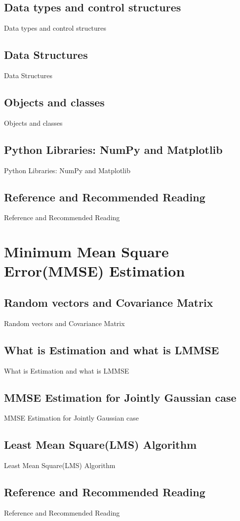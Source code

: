 \documentclass[a4paper,12pt]{article}
\begin{document}
\subsection{Data types and control structures}
Data types and control structures
\subsection{Data Structures}
Data Structures
\subsection{Objects and classes}
Objects and classes
\subsection{Python Libraries: NumPy and Matplotlib}
Python Libraries: NumPy and Matplotlib
\subsection{Reference and Recommended Reading}
Reference and Recommended Reading

\clearpage
\section{Minimum Mean Square Error(MMSE) Estimation}
\subsection{Random vectors and Covariance Matrix}
Random vectors and Covariance Matrix
\subsection{What is Estimation and what is LMMSE}
What is Estimation and what is LMMSE
\subsection{MMSE Estimation for Jointly Gaussian case}
MMSE Estimation for Jointly Gaussian case
\subsection{Least Mean Square(LMS) Algorithm}
Least Mean Square(LMS) Algorithm
\subsection{Reference and Recommended Reading}
Reference and Recommended Reading
\end{document}
